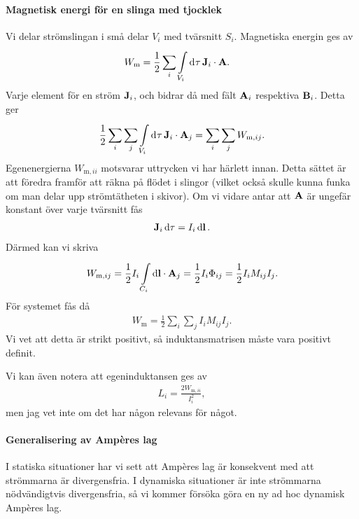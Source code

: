 \paragraph{Magnetisk energi för en slinga med tjocklek}
Vi delar strömslingan i små delar $V_{i}$ med tvärsnitt $S_{i}$. Magnetiska energin ges av
\begin{align*}
	W_{\text{m}} &= \frac{1}{2}\sum\limits_{i}\int\limits_{V_{i}}^{}\dd[]{\tau}\vb{J}_{i}\cdot\vb{A}.
\end{align*}
Varje element för en ström $\vb{J}_{i}$, och bidrar då med fält $\vb{A}_{i}$ respektiva $\vb{B}_{i}$. Detta ger
\begin{align*}
	\frac{1}{2}\sum\limits_{i}\sum\limits_{j}\int\limits_{V_{i}}^{}\dd[]{\tau}\vb{J}_{i}\cdot\vb{A}_{j} = \sum\limits_{i}\sum\limits_{j}W_{\text{m}, ij}.
\end{align*}
Egenenergierna $W_{\text{m}, ii}$ motsvarar uttrycken vi har härlett innan. Detta sättet är att föredra framför att räkna på flödet i slingor (vilket också skulle kunna funka om man delar upp strömtätheten i skivor). Om vi vidare antar att $\vb{A}$ är ungefär konstant över varje tvärsnitt fås
\begin{align*}
	\vb{J}_{i}\dd{\tau} = I_{i}\dd{\vb{l}}.
\end{align*}
Därmed kan vi skriva
\begin{align*}
	W_{\text{m}, ij} = \frac{1}{2}I_{i}\int\limits_{C_{i}}^{}\dd{\vb{l}}\cdot \vb{A}_{j} = \frac{1}{2}I_{i}\Phi_{ij} = \frac{1}{2}I_{i}M_{ij}I_{j}.
\end{align*}
För systemet fås då
\begin{align*}
	W_{\text{m}} = \frac{1}{2}\sum\limits_{i}\sum\limits_{j}I_{i}M_{ij}I_{j}.
\end{align*}
Vi vet att detta är strikt positivt, så induktansmatrisen måste vara positivt definit.

Vi kan även notera att egeninduktansen ges av
\begin{align*}
	L_{i} = \frac{2W_{\text{m}, ii}}{I_{i}^{2}},
\end{align*}
men jag vet inte om det har någon relevans för något.

\paragraph{Generalisering av Ampères lag}
I statiska situationer har vi sett att Ampères lag är konsekvent med att strömmarna är divergensfria. I dynamiska situationer är inte strömmarna nödvändigtvis divergensfria, så vi kommer försöka göra en ny ad hoc dynamisk Ampères lag.

